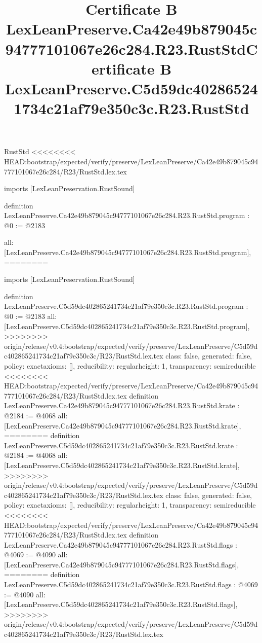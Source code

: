 \begin{lexlean}{RustStd}
<<<<<<<< HEAD:bootstrap/expected/verify/preserve/LexLeanPreserve/Ca42e49b879045c94777101067e26c284/R23/RustStd.lex.tex
\title{Certificate B LexLeanPreserve.Ca42e49b879045c94777101067e26c284.R23.RustStd}
\begin{coremodule}
imports [LexLeanPreservation.RustSound]

definition LexLeanPreserve.Ca42e49b879045c94777101067e26c284.R23.RustStd.program : @0 := @2183 {
  all: [LexLeanPreserve.Ca42e49b879045c94777101067e26c284.R23.RustStd.program],
========
\title{Certificate B LexLeanPreserve.C5d59dc402865241734c21af79e350c3c.R23.RustStd}
\begin{coremodule}
imports [LexLeanPreservation.RustSound]

definition LexLeanPreserve.C5d59dc402865241734c21af79e350c3c.R23.RustStd.program : @0 := @2183 {
  all: [LexLeanPreserve.C5d59dc402865241734c21af79e350c3c.R23.RustStd.program],
>>>>>>>> origin/release/v0.4:bootstrap/expected/verify/preserve/LexLeanPreserve/C5d59dc402865241734c21af79e350c3c/R23/RustStd.lex.tex
  class: false,
  generated: false,
  policy: exact{axioms: []},
  reducibility: regular{height: 1},
  transparency: semireducible
}
<<<<<<<< HEAD:bootstrap/expected/verify/preserve/LexLeanPreserve/Ca42e49b879045c94777101067e26c284/R23/RustStd.lex.tex
definition LexLeanPreserve.Ca42e49b879045c94777101067e26c284.R23.RustStd.krate : @2184 := @4068 {
  all: [LexLeanPreserve.Ca42e49b879045c94777101067e26c284.R23.RustStd.krate],
========
definition LexLeanPreserve.C5d59dc402865241734c21af79e350c3c.R23.RustStd.krate : @2184 := @4068 {
  all: [LexLeanPreserve.C5d59dc402865241734c21af79e350c3c.R23.RustStd.krate],
>>>>>>>> origin/release/v0.4:bootstrap/expected/verify/preserve/LexLeanPreserve/C5d59dc402865241734c21af79e350c3c/R23/RustStd.lex.tex
  class: false,
  generated: false,
  policy: exact{axioms: []},
  reducibility: regular{height: 1},
  transparency: semireducible
}
<<<<<<<< HEAD:bootstrap/expected/verify/preserve/LexLeanPreserve/Ca42e49b879045c94777101067e26c284/R23/RustStd.lex.tex
definition LexLeanPreserve.Ca42e49b879045c94777101067e26c284.R23.RustStd.flags : @4069 := @4090 {
  all: [LexLeanPreserve.Ca42e49b879045c94777101067e26c284.R23.RustStd.flags],
========
definition LexLeanPreserve.C5d59dc402865241734c21af79e350c3c.R23.RustStd.flags : @4069 := @4090 {
  all: [LexLeanPreserve.C5d59dc402865241734c21af79e350c3c.R23.RustStd.flags],
>>>>>>>> origin/release/v0.4:bootstrap/expected/verify/preserve/LexLeanPreserve/C5d59dc402865241734c21af79e350c3c/R23/RustStd.lex.tex
}}}
\end{coremodule}}
\end{coremodule}
\end{lexlean}
